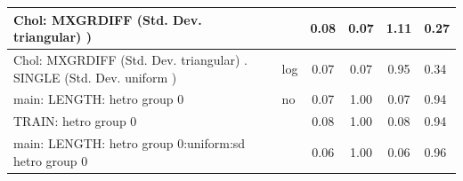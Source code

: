 \begin{table}
\begin{center}
\begin{tabular}{|l|l|c|c|c|l|}
			\hline
			 Chol: MXGRDIFF (Std. Dev. triangular) ) &  & 0.08 & 0.07 & 1.11 & 0.27 \\
			\hline
			 Chol: MXGRDIFF (Std. Dev. triangular) . SINGLE (Std. Dev.   uniform ) & log & 0.07 & 0.07 & 0.95 & 0.34 \\
			\hline
			main: LENGTH: hetro group 0 & no & 0.07 & 1.00 & 0.07 & 0.94 \\
			\hline
			TRAIN: hetro group 0 &  & 0.08 & 1.00 & 0.08 & 0.94 \\
			\hline
			main: LENGTH: hetro group 0:uniform:sd  hetro group 0 &  & 0.06 & 1.00 & 0.06 & 0.96 \\
			\hline
		\end{tabular}
	\end{center}
\end{table}